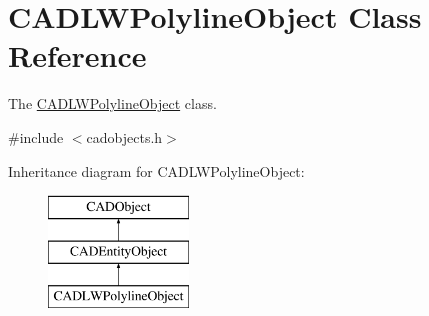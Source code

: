 \hypertarget{class_c_a_d_l_w_polyline_object}{}\section{C\+A\+D\+L\+W\+Polyline\+Object Class Reference}
\label{class_c_a_d_l_w_polyline_object}


The \hyperlink{class_c_a_d_l_w_polyline_object}{C\+A\+D\+L\+W\+Polyline\+Object} class.  




{\ttfamily \#include $<$cadobjects.\+h$>$}

Inheritance diagram for C\+A\+D\+L\+W\+Polyline\+Object\+:\begin{figure}[H]
\begin{center}
\leavevmode
\includegraphics[height=3.000000cm]{class_c_a_d_l_w_polyline_object}
\end{center}
\end{figure}
